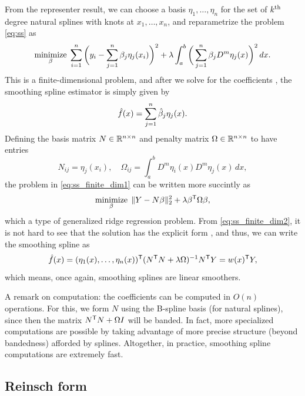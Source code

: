 \documentclass{article}
\begin{document}
From the representer result, we can choose a basis $\eta_1,\dots,\eta_n$ for the
set of $k^{\text{th}}$ degree natural splines with knots at $x_1,\dots,x_n$, and
reparametrize the problem \eqref{eq:ss} as  
\begin{equation}
\label{eq:ss_finite_dim1}
\mathop{\mathrm{minimize}}_\beta \; \sum_{i=1}^n \bigg( y_i - \sum_{j=1}^n \beta_j \eta_j(x_i)
\bigg)^2 + \lambda \int_a^b \bigg( \sum_{j=1}^n \beta_j D^m \eta_j(x) \bigg)^2
\, dx.  
\end{equation}
This is a finite-dimensional problem, and after we solve for the coefficients
, the smoothing spline estimator is simply given by  
\[
\hat{f}(x) = \sum_{j=1}^n \hat{\beta}_j \eta_j(x).
\]
Defining the basis matrix $N \in \mathbb{R}^{n \times n}$ and penalty matrix $\Omega \in
\mathbb{R}^{n \times n}$ to have entries
\[
N_{ij} = \eta_j(x_i), \quad 
\Omega_{ij} = \int_a^b D^m \eta_i(x) D^m \eta_j(x) \, dx,
\]
the problem in \eqref{eq:ss_finite_dim1} can be written more succintly as 
\begin{equation}
\label{eq:ss_finite_dim2}
\mathop{\mathrm{minimize}}_\beta \; \|Y - N\beta\|_2^2 + \lambda \beta^{\mathsf{T}} \Omega \beta,   
\end{equation}
which a type of generalized ridge regression problem. From
\eqref{eq:ss_finite_dim2}, it is not hard to see that the solution has the
explicit form , and
thus, we can write the smoothing spline as    
\[
\hat{f}(x) = (\eta_1(x),\dots,\eta_n(x))^{\mathsf{T}} (N^{\mathsf{T}} N + \lambda \Omega)^{-1} N^{\mathsf{T}} Y =
w(x)^{\mathsf{T}} Y,   
\]
which means, once again, smoothing splines are linear smoothers.

A remark on computation: the coefficients  can be computed in $O(n)$ operations. For this, we form  
$N$ using the B-spline basis (for natural splines), since then the matrix $N^{\mathsf{T}}
N + \Omega I$ will be banded. In fact, more specialized computations are
possible by taking advantage of more precise structure (beyond bandedness)
afforded by splines. Altogether, in practice, smoothing spline computations are 
extremely fast. 

\subsection{Reinsch form}
\end{document}
